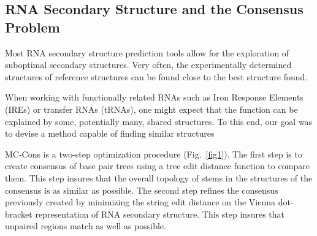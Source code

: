 \documentclass[10pt,letterpaper]{article}
\begin{document}
%
%
%



\subsection*{RNA Secondary Structure and the Consensus Problem}

Most RNA secondary structure prediction tools allow for the exploration of suboptimal secondary structures. Very often, the experimentally determined structures of reference structures can be found close to the best structure found.

When working with functionally related RNAs such as Iron Response Elements (IREs) or transfer RNAs (tRNAs), one might expect that the function can be explained by some, potentially many, shared structures. To this end, our goal was to devise a method capable of finding similar structures

MC-Cons is a two-step optimization procedure (Fig.~\ref{fig1}). The first step is to create consensus of base pair trees using a tree edit distance function to compare them. This step insures that the overall topology of stems in the structures of the consensus is as similar as possible. The second step refines the consensus previously created by minimizing the string edit distance on the Vienna dot-bracket representation of RNA secondary structure. This step insures that unpaired regions match as well as possible.
\end{document}
